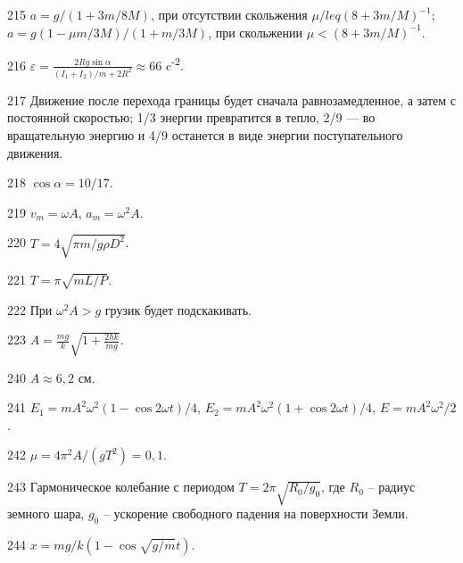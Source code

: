 \begin{Answer}{215}
$a = g/(1+3m/8M)$, при отсутствии скольжения $\mu /leq (8+3m/M)^{-1}$; $a = g(1 - \mu m/3M)/(1+m/3M)$, при скольжении $\mu < (8+3m/M)^{-1}$.
\end{Answer}
\begin{Answer}{216}
$\varepsilon = \frac{2Rg \sin \alpha}{(I_1 + I_2)/m + 2R^2} \approx 66$ c\textsuperscript{-2}.
\end{Answer}
\begin{Answer}{217}
Движение после перехода границы будет сначала равнозамедленное, а затем с постоянной скоростью; 1/3 энергии превратится в тепло, 2/9 — во вращательную энергию и 4/9 останется в виде энергии поступательного движения.
\end{Answer}
\begin{Answer}{218}
$\cos \alpha = 10/17$.
\end{Answer}
\begin{Answer}{219}
$v_m = \omega A$, $a_m = \omega^2 A$.
\end{Answer}
\begin{Answer}{220}
$T = 4 \sqrt{\pi m / g \rho D^2}$.
\end{Answer}
\begin{Answer}{221}
$T = \pi \sqrt{m L /P}$.
\end{Answer}
\begin{Answer}{222}
При $\omega^2 A > g$ грузик будет подскакивать.
\end{Answer}
\begin{Answer}{223}
$A = \frac{mg}{k}\sqrt{ 1 + \frac{2hk}{mg}}$.
\end{Answer}
\begin{Answer}{240}
$A \approx 6,2$ см.
\end{Answer}
\begin{Answer}{241}
$E_1 = m A^2 \omega^2 (1 - \cos 2 \omega t)/4$, $E_2 = m A^2 \omega^2 (1 + \cos 2 \omega t)/4$, $E = m A^2 \omega^2 /2$.
\end{Answer}
\begin{Answer}{242}
$\mu = 4 \pi^2 A / (gT^2) = 0,1$.
\end{Answer}
\begin{Answer}{243}
Гармоническое колебание с периодом $T = 2 \pi \sqrt{R_0 / g_0}$, где $R_0$ -- радиус земного шара, $g_0$ -- ускорение свободного падения на поверхности Земли.
\end{Answer}
\begin{Answer}{244}
$x = mg/k(1-\cos \sqrt{g/m} t)$.
\end{Answer}
